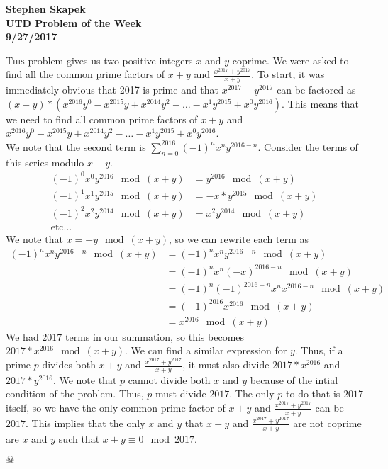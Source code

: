 \documentclass{article}
\begin{document}
\begin{flushright}
\textbf{Stephen Skapek\\UTD Problem of the Week\\9/27/2017}
\end{flushright}

\lettrine[realheight]{T}{his} problem gives us two positive integers $x$ and $y$ coprime. We were asked to find all the common prime factors of $x + y$ and $\frac{x^{2017} + y^{2017}}{x+y}$. To start, it was immediately obvious that 2017 is prime and that $x^{2017} + y^{2017}$ can be factored as $(x+y)*(x^{2016}y^{0}-x^{2015}y+x^{2014}y^{2}-\dots-x^{1}y^{2015}+x^{0}y^{2016})$. This means that we need to find all common prime factors of $x + y$ and $x^{2016}y^{0}-x^{2015}y+x^{2014}y^{2}-\dots-x^{1}y^{2015}+x^{0}y^{2016}$.\\
We note that the second term is $\sum_{n=0}^{2016}(-1)^{n}x^{n}y^{2016-n}$. Consider the terms of this series modulo $x+y$. 
\begin{align*}
(-1)^{0}x^{0}y^{2016} \mod (x+y) &= y^{2016} \mod (x+y)\\
(-1)^{1}x^{1}y^{2015} \mod (x+y) &= -x*y^{2015} \mod (x+y)\\
(-1)^{2}x^{2}y^{2014} \mod (x+y) &= x^{2}y^{2014} \mod (x+y)\\
\text{etc...}
\end{align*}
We note that $x = -y \mod (x+y)$, so we can rewrite each term as 
\begin{align*}
(-1)^{n}x^{n}y^{2016-n} \mod (x+y) &= (-1)^{n}x^{n}y^{2016-n} \mod (x+y)\\
&= (-1)^{n}x^{n}(-x)^{2016-n} \mod(x+y)\\
&= (-1)^{n}(-1)^{2016-n}x^{n}x^{2016-n} \mod(x+y)\\
&= (-1)^{2016}x^{2016} \mod(x+y)\\
&= x^{2016} \mod(x+y)
\end{align*}
We had 2017 terms in our summation, so this becomes $2017*x^{2016} \mod(x+y)$. We can find a similar expression for $y$. Thus, if a prime $p$ divides both $x+y$ and $\frac{x^{2017} + y^{2017}}{x+y}$, it must also divide $2017*x^{2016}$ and $2017*y^{2016}$. We note that $p$ cannot divide both $x$ and $y$ because of the intial condition of the problem. Thus, $p$ must divide $2017$. The only $p$ to do that is $2017$ itself, so we have the only common prime factor of  $x + y$ and $\frac{x^{2017} + y^{2017}}{x+y}$ can be $2017$. This implies that the only $x$ and $y$ that  $x + y$ and $\frac{x^{2017} + y^{2017}}{x+y}$ are not coprime are $x$ and $y$ such that $x+y \equiv 0 \mod 2017$.\\
\begin{flushright}
$\skull$
\end{flushright}
\end{document}
